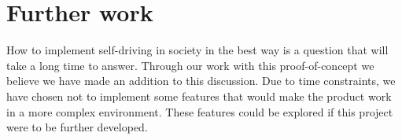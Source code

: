 \section{Further work}
How to implement self-driving in society in the best way is a question that will take a long time to answer. Through our work with this proof-of-concept we believe we have made an addition to this discussion. Due to time constraints, we have chosen not to implement some features that would make the product work in a more complex environment. These features could be explored if this project were to be further developed. 



%